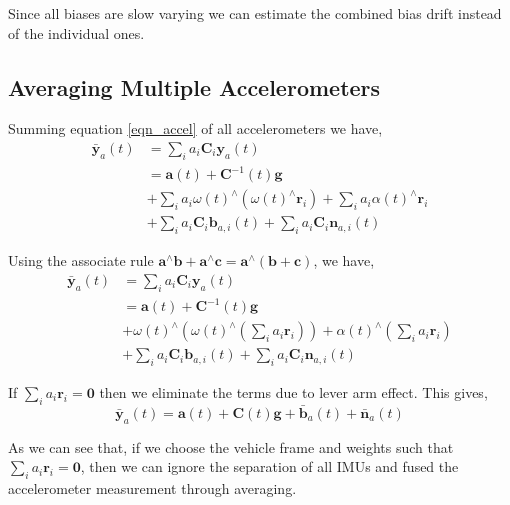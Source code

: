 \documentclass[conference]{IEEEtran}
\begin{document}
Since all biases are slow varying we can estimate the combined bias drift instead of the individual ones.

\subsection{Averaging Multiple Accelerometers}

Summing equation \ref{eqn_accel} of all accelerometers we have,
\begin{equation}
\begin{split}
    \bar{\textbf{y}}_a(t) &= \sum_i{a_i \textbf{C}_{i} \textbf{y}_a(t)} \\
    &= \textbf{a}(t) + \textbf{C}^{-1}(t)\textbf{g} \\
    &+ \sum_i{a_i \omega(t)^\wedge (\omega(t)^\wedge \textbf{r}_i)} + \sum_i{a_i \alpha(t)^\wedge \textbf{r}_i} \\
    &+ \sum_i{a_i \textbf{C}_{i} \textbf{b}_{a,i}(t)} + \sum_i{a_i \textbf{C}_{i} \textbf{n}_{a,i}(t)}
\end{split}
\end{equation}

Using the associate rule $\textbf{a}^\wedge \textbf{b} + \textbf{a}^\wedge \textbf{c} = \textbf{a}^\wedge \left(\textbf{b} + \textbf{c}\right)$, we have,
\begin{equation}
\begin{split}
    \bar{\textbf{y}}_a(t) &= \sum_i{a_i \textbf{C}_{i} \textbf{y}_a(t)} \\
    &= \textbf{a}(t) + \textbf{C}^{-1}(t)\textbf{g} \\
    &+ \omega(t)^\wedge \left(\omega(t)^\wedge \left( \sum_i{a_i \textbf{r}_i} \right) \right) + \alpha(t)^\wedge \left( \sum_i{a_i\textbf{r}_i} \right)\\
    &+ \sum_i{a_i \textbf{C}_{i} \textbf{b}_{a,i}(t)} + \sum_i{a_i \textbf{C}_{i} \textbf{n}_{a,i}(t)}
\end{split}
\end{equation}

If $\sum_i{a_i \textbf{r}_i} = \textbf{0}$ then we eliminate the terms due to lever arm effect. This gives,
\begin{equation}
    \bar{\textbf{y}}_a(t) = \textbf{a}(t) + \textbf{C}(t)\textbf{g} + \bar{\textbf{b}}_a(t) + \bar{\textbf{n}}_a(t)
\end{equation}

As we can see that, if we choose the vehicle frame and weights such that $\sum_i{a_i \textbf{r}_i} = \textbf{0}$, then we can ignore the separation of all IMUs and fused the accelerometer measurement through averaging.
\end{document}
